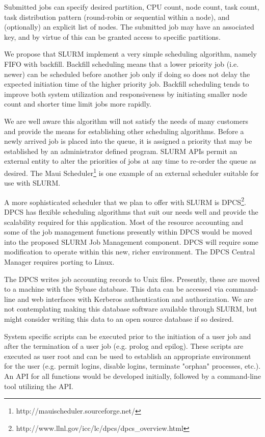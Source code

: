 Submitted jobs can specify desired partition, CPU count, node count, task 
count, task distribution pattern (round-robin or sequential within a node), 
and (optionally) an explicit list of nodes. The submitted job may have an 
associated key, and by virtue of this can be granted access to specific partitions. 

We propose that SLURM implement a very simple scheduling algorithm, 
namely FIFO with backfill. Backfill scheduling 
means that a lower priority job (i.e. newer) can be scheduled before 
another job only if doing so does not delay the expected initiation 
time of the higher priority job. Backfill scheduling tends to improve 
both system utilization and responsiveness by initiating smaller 
node count and shorter time limit jobs more rapidly. 

We are well aware this algorithm will not satisfy the needs of many 
customers and provide the means for establishing other scheduling 
algorithms. Before a newly arrived job is placed into the queue, it 
is assigned a priority that may be established by an administrator 
defined program. SLURM APIs permit an external entity to alter the 
priorities of jobs at any time to re-order the queue as desired. 
The Maui Scheduler\footnote{http://mauischeduler.sourceforge.net/} 
is one example of an external scheduler suitable for use with SLURM.

A more sophisticated scheduler that we plan to offer with SLURM is 
DPCS\footnote{http://www.llnl.gov/icc/lc/dpcs/dpcs\_overview.html}. 
DPCS has flexible scheduling algorithms that suit our needs well and
provide the scalability required for this application. Most of the resource
accounting and some of the job management functions presently within DPCS would
be moved into the proposed SLURM Job Management component. 
DPCS will require some modification to operate within this new, richer
environment. The DPCS Central Manager requires porting to Linux. 

The DPCS writes job accounting records to Unix files. Presently, these are
moved to a machine with the Sybase database. This data can be accessed via
command-line and web interfaces with Kerberos authentication and authorization.
We are not contemplating making this database software available through SLURM,
but might consider writing this data to an open source database if so desired.

System specific scripts can be executed prior to the initiation of a user job
and after the termination of a user job (e.g. prolog and epilog). 
These scripts are executed as user root and can be used to establish an 
appropriate environment for the user (e.g. permit
logins, disable logins, terminate "orphan" processes, etc.). 
An API for all functions would be developed initially, followed by a  
command-line tool utilizing the API. 

